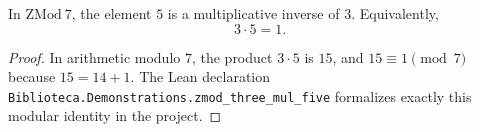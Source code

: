 
\begin{theorem}
  \label{thm:zmod_inverse}
  \leanok
  In $\mathrm{ZMod}\ 7$, the element $5$ is a multiplicative inverse of $3$.
  Equivalently,
  \[
    3 \cdot 5 = 1.
  \]
\end{theorem}

\begin{proof}
  In arithmetic modulo $7$, the product $3 \cdot 5$ is $15$, and
  $15 \equiv 1 \pmod 7$ because $15 = 14 + 1$. The Lean declaration
  \texttt{Biblioteca.Demonstrations.zmod\_three\_mul\_five} formalizes exactly
  this modular identity in the project.
\end{proof}
